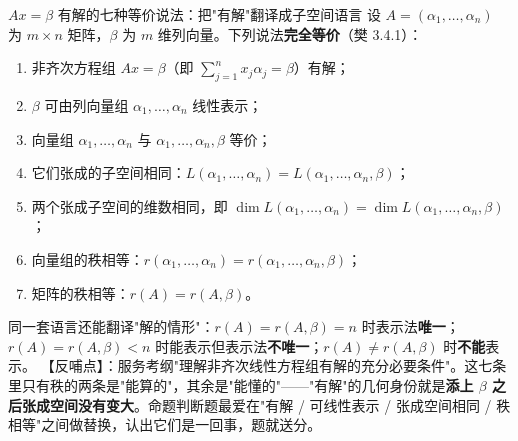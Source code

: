 \begin{fdeep}{$Ax=\beta$ 有解的七种等价说法：把"有解"翻译成子空间语言}
设 $A=(\alpha_1,\dots,\alpha_n)$ 为 $m\times n$ 矩阵，$\beta$ 为 $m$ 维列向量。下列说法\textbf{完全等价}（樊 3.4.1）：
\begin{enumerate}[leftmargin=2.2em,itemsep=0.2em]
\item 非齐次方程组 $Ax=\beta$（即 $\sum_{j=1}^{n}x_j\alpha_j=\beta$）有解；
\item $\beta$ 可由列向量组 $\alpha_1,\dots,\alpha_n$ 线性表示；
\item 向量组 $\alpha_1,\dots,\alpha_n$ 与 $\alpha_1,\dots,\alpha_n,\beta$ 等价；
\item 它们张成的子空间相同：$L(\alpha_1,\dots,\alpha_n)=L(\alpha_1,\dots,\alpha_n,\beta)$；
\item 两个张成子空间的维数相同，即 $\dim L(\alpha_1,\dots,\alpha_n)=\dim L(\alpha_1,\dots,\alpha_n,\beta)$；
\item 向量组的秩相等：$r(\alpha_1,\dots,\alpha_n)=r(\alpha_1,\dots,\alpha_n,\beta)$；
\item 矩阵的秩相等：$r(A)=r(A,\beta)$。
\end{enumerate}
同一套语言还能翻译"解的情形"：$r(A)=r(A,\beta)=n$ 时表示法\textbf{唯一}；$r(A)=r(A,\beta)<n$ 时能表示但表示法\textbf{不唯一}；$r(A)\ne r(A,\beta)$ 时\textbf{不能}表示。
【反哺点】：服务考纲"理解非齐次线性方程组有解的充分必要条件"。这七条里只有秩的两条是"能算的"，其余是"能懂的"——"有解"的几何身份就是\textbf{添上 $\beta$ 之后张成空间没有变大}。命题判断题最爱在"有解 / 可线性表示 / 张成空间相同 / 秩相等"之间做替换，认出它们是一回事，题就送分。
\end{fdeep}

